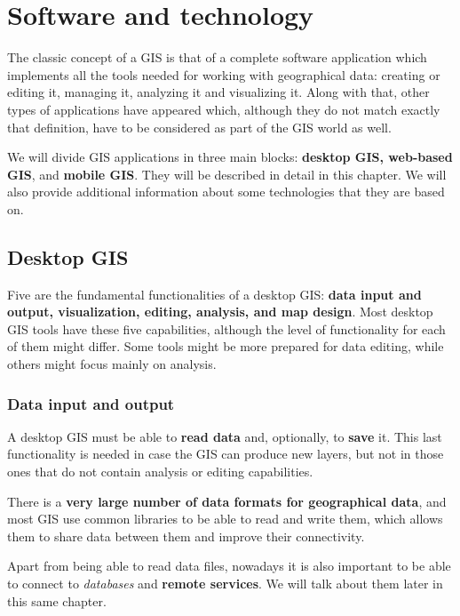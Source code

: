 
\chapter{Software and technology}

\pagestyle{fancy}

The classic concept of a GIS is that of a complete software application which implements all the tools needed for working with geographical data: creating or editing it, managing it, analyzing it and visualizing it. Along with that, other types of applications have appeared which, although they do not match exactly that definition, have to be considered as part of the GIS world as well.

We will divide GIS applications in three main blocks: \textbf{desktop GIS, web-based GIS}, and \textbf{mobile GIS}. They will be described in detail in this chapter. We will also provide additional information about some technologies that they are based on.


\section{Desktop GIS}

Five are the fundamental functionalities of a desktop GIS: \textbf{data input and output, visualization, editing, analysis, and map design}. Most desktop GIS tools have these five capabilities, although the level of functionality for each of them might differ. Some tools might be more prepared for data editing, while others might focus mainly on analysis.

\subsection{Data input and output}

A desktop GIS must be able to \textbf{read data} and, optionally, to \textbf{save} it. This last functionality is needed in case the GIS can produce new layers, but not in those ones that do not contain analysis or editing capabilities.

There is a \textbf{very large number of data formats for geographical data}, and most GIS use common libraries to be able to read and write them, which allows them to share data between them and improve their connectivity.

Apart from being able to read data files, nowadays it is also important to be able to connect to \emph{databases} and \textbf{remote services}. We will talk about them later in this same chapter.

